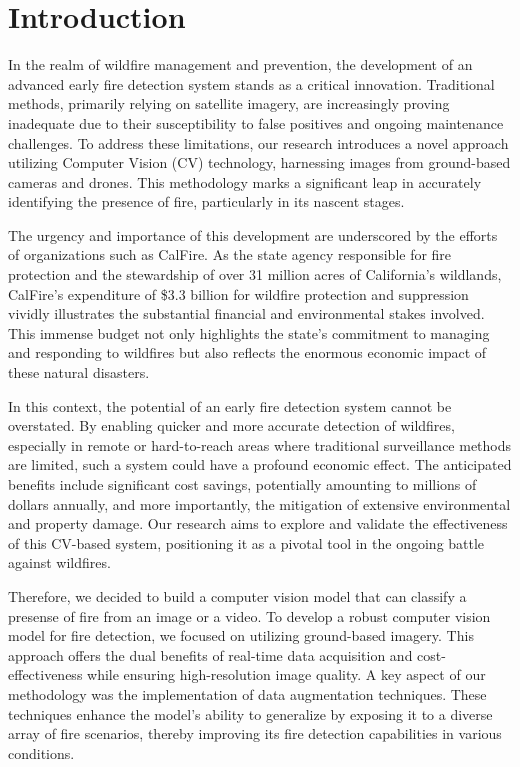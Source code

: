 \section{Introduction}

In the realm of wildfire management and prevention, the development of an advanced early fire detection system stands as a critical innovation. Traditional methods, primarily relying on satellite imagery, are increasingly proving inadequate due to their susceptibility to false positives and ongoing maintenance challenges. To address these limitations, our research introduces a novel approach utilizing Computer Vision (CV) technology, harnessing images from ground-based cameras and drones. This methodology marks a significant leap in accurately identifying the presence of fire, particularly in its nascent stages.

The urgency and importance of this development are underscored by the efforts of organizations such as CalFire. As the state agency responsible for fire protection and the stewardship of over 31 million acres of California's wildlands, CalFire's expenditure of \$3.3 billion for wildfire protection and suppression vividly illustrates the substantial financial and environmental stakes involved. ~\citep{calfire} This immense budget not only highlights the state's commitment to managing and responding to wildfires but also reflects the enormous economic impact of these natural disasters.

In this context, the potential of an early fire detection system cannot be overstated. By enabling quicker and more accurate detection of wildfires, especially in remote or hard-to-reach areas where traditional surveillance methods are limited, such a system could have a profound economic effect. The anticipated benefits include significant cost savings, potentially amounting to millions of dollars annually, and more importantly, the mitigation of extensive environmental and property damage. Our research aims to explore and validate the effectiveness of this CV-based system, positioning it as a pivotal tool in the ongoing battle against wildfires.


Therefore, we decided to build a computer vision model that can classify a presense of fire from an image or a video. To develop a robust computer vision model for fire detection, we focused on utilizing ground-based imagery. This approach offers the dual benefits of real-time data acquisition and cost-effectiveness while ensuring high-resolution image quality. A key aspect of our methodology was the implementation of data augmentation techniques. These techniques enhance the model's ability to generalize by exposing it to a diverse array of fire scenarios, thereby improving its fire detection capabilities in various conditions.

